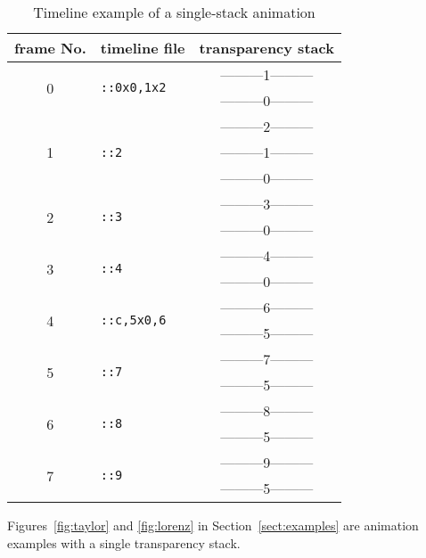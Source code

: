 \documentclass[a4paper]{article}
\begin{document}
\begin{table}[ht]\centering
\caption{Timeline example of a single-stack animation}\label{tab:single}
\begin{tabular}[t]{c|l|c}\hline
frame No. & timeline file & transparency stack\\\hline\hline
\multirow{2}{*}{0} & \multirow{2}{*}{\tt::0x0,1x2} & ---------1---------\\&&---------0---------\\\cline{1-1}\cline{3-3}
\multirow{3}{*}{1} & \multirow{3}{*}{\tt::2} & ---------2---------\\&&---------1---------\\&&---------0---------\\\cline{1-1}\cline{3-3}
\multirow{2}{*}{2} & \multirow{2}{*}{\tt::3} & ---------3---------\\&&---------0---------\\\cline{1-1}\cline{3-3}
\multirow{2}{*}{3} & \multirow{2}{*}{\tt::4} & ---------4---------\\&&---------0---------\\\cline{1-1}\cline{3-3}
\multirow{2}{*}{4} & \multirow{2}{*}{\tt::c,5x0,6} & ---------6---------\\&&---------5---------\\\cline{1-1}\cline{3-3}
\multirow{2}{*}{5} & \multirow{2}{*}{\tt::7} & ---------7---------\\&&---------5---------\\\cline{1-1}\cline{3-3}
\multirow{2}{*}{6} & \multirow{2}{*}{\tt::8} & ---------8---------\\&&---------5---------\\\cline{1-1}\cline{3-3}
\multirow{2}{*}{7} & \multirow{2}{*}{\tt::9} & ---------9---------\\&&---------5---------\\\hline
\end{tabular}
\end{table}

Figures~\ref{fig:taylor} and \ref{fig:lorenz} in Section~\ref{sect:examples} are animation examples with a single transparency stack.
\end{document}
